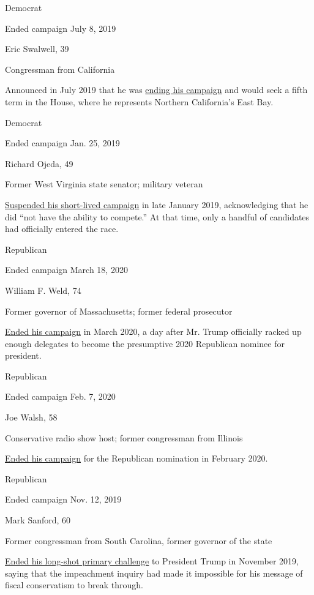 Democrat

Ended campaign July 8, 2019

Eric Swalwell, 39

Congressman from California

Announced in July 2019 that he was
\href{https://www.nytimes.com/2019/07/08/us/politics/steyer-swalwell-2020.html}{ending
his campaign} and would seek a fifth term in the House, where he
represents Northern California's East Bay.

Democrat

Ended campaign Jan. 25, 2019

Richard Ojeda, 49

Former West Virginia state senator; military veteran

\href{https://www.facebook.com/RichardOjeda2020/posts/2329884223911515}{Suspended
his short-lived campaign} in late January 2019, acknowledging that he
did ``not have the ability to compete.'' At that time, only a handful of
candidates had officially entered the race.

Republican

Ended campaign March 18, 2020

William F. Weld, 74

Former governor of Massachusetts; former federal prosecutor

\href{https://www.nytimes.com/2020/03/18/us/politics/bill-weld-drops-out.html}{Ended
his campaign} in March 2020, a day after Mr. Trump officially racked up
enough delegates to become the presumptive 2020 Republican nominee for
president.

Republican

Ended campaign Feb. 7, 2020

Joe Walsh, 58

Conservative radio show host; former congressman from Illinois

\href{https://www.nytimes.com/2020/02/07/us/politics/joe-walsh-drops-out.html}{Ended
his campaign} for the Republican nomination in February 2020.

Republican

Ended campaign Nov. 12, 2019

Mark Sanford, 60

Former congressman from South Carolina, former governor of the state

\href{https://www.nytimes.com/2019/11/12/us/politics/mark-sanford-2020.html}{Ended
his long-shot primary challenge} to President Trump in November 2019,
saying that the impeachment inquiry had made it impossible for his
message of fiscal conservatism to break through.

